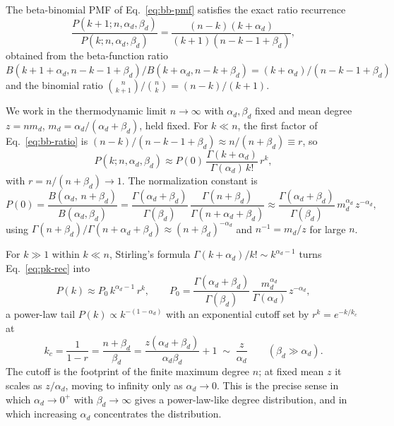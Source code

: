 \documentclass[]{revtex4-2}
\begin{document}
The beta-binomial PMF of Eq.~\eqref{eq:bb-pmf} satisfies the exact ratio recurrence
\begin{equation}
    \frac{P(k+1;n,\alpha_d,\beta_d)}{P(k;n,\alpha_d,\beta_d)}
    = \frac{(n-k)(k+\alpha_d)}{(k+1)(n-k-1+\beta_d)},
    \label{eq:bb-ratio}
\end{equation}
obtained from the beta-function ratio $B(k+1+\alpha_d,n-k-1+\beta_d)/B(k+\alpha_d,n-k+\beta_d) = (k+\alpha_d)/(n-k-1+\beta_d)$ and the binomial ratio $\binom{n}{k+1}/\binom{n}{k} = (n-k)/(k+1)$.

We work in the thermodynamic limit $n\to\infty$ with $\alpha_d,\beta_d$ fixed and mean degree $z = n m_d$, $m_d=\alpha_d/(\alpha_d+\beta_d)$, held fixed. For $k\ll n$, the first factor of Eq.~\eqref{eq:bb-ratio} is $(n-k)/(n-k-1+\beta_d) \approx n/(n+\beta_d) \equiv r$, so
\begin{equation}
    P(k;n,\alpha_d,\beta_d) \approx P(0)\, \frac{\Gamma(k+\alpha_d)}{\Gamma(\alpha_d)\,k!}\,r^k,
    \label{eq:pk-rec}
\end{equation}
with $r = n/(n+\beta_d)\to 1$. The normalization constant is
\begin{equation}
    P(0) = \frac{B(\alpha_d,\,n+\beta_d)}{B(\alpha_d,\beta_d)}
    = \frac{\Gamma(\alpha_d+\beta_d)}{\Gamma(\beta_d)}\,
    \frac{\Gamma(n+\beta_d)}{\Gamma(n+\alpha_d+\beta_d)}
    \approx \frac{\Gamma(\alpha_d+\beta_d)}{\Gamma(\beta_d)}\,
    m_d^{\alpha_d}\,z^{-\alpha_d},
\end{equation}
using $\Gamma(n+\beta_d)/\Gamma(n+\alpha_d+\beta_d) \approx (n+\beta_d)^{-\alpha_d}$ and $n^{-1}=m_d/z$ for large $n$.

For $k\gg1$ within $k\ll n$, Stirling's formula $\Gamma(k+\alpha_d)/k! \sim k^{\alpha_d-1}$ turns Eq.~\eqref{eq:pk-rec} into
\begin{equation}
    P(k) \approx P_0\, k^{\alpha_d-1}\,r^k,
    \qquad
    P_0 = \frac{\Gamma(\alpha_d+\beta_d)}{\Gamma(\beta_d)}\,
    \frac{m_d^{\alpha_d}}{\Gamma(\alpha_d)}\,z^{-\alpha_d},
    \label{eq:pk-asym}
\end{equation}
a power-law tail $P(k)\propto k^{-(1-\alpha_d)}$ with an exponential cutoff set by $r^k = e^{-k/k_c}$ at
\begin{equation}
    k_c = \frac{1}{1-r} = \frac{n+\beta_d}{\beta_d}
    = \frac{z(\alpha_d+\beta_d)}{\alpha_d\beta_d} + 1
    \;\sim\; \frac{z}{\alpha_d}
    \qquad(\beta_d\gg\alpha_d).
\end{equation}
The cutoff is the footprint of the finite maximum degree $n$; at fixed mean $z$ it scales as $z/\alpha_d$, moving to infinity only as $\alpha_d\to0$. This is the precise sense in which $\alpha_d\to0^+$ with $\beta_d\to\infty$ gives a power-law-like degree distribution, and in which increasing $\alpha_d$ concentrates the distribution.
\end{document}
